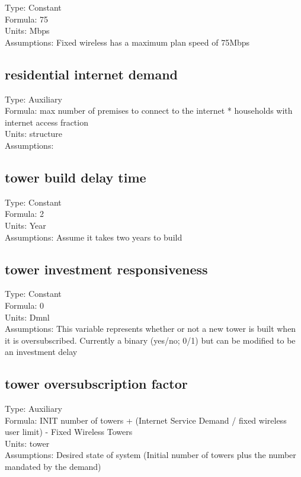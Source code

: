 \documentclass[
  11pt,
]{book}
\begin{document}
Type: Constant\\
Formula: 75\\
Units: Mbps\\
Assumptions: Fixed wireless has a maximum plan speed of 75Mbps

\hypertarget{residential-internet-demand}{%
\subsection{residential internet demand}\label{residential-internet-demand}}

Type: Auxiliary\\
Formula: max number of premises to connect to the internet * households with internet access fraction\\
Units: structure\\
Assumptions:

\hypertarget{tower-build-delay-time}{%
\subsection{tower build delay time}\label{tower-build-delay-time}}

Type: Constant\\
Formula: 2\\
Units: Year\\
Assumptions: Assume it takes two years to build

\hypertarget{tower-investment-responsiveness}{%
\subsection{tower investment responsiveness}\label{tower-investment-responsiveness}}

Type: Constant\\
Formula: 0\\
Units: Dmnl\\
Assumptions: This variable represents whether or not a new tower is built when it is oversubscribed. Currently a binary (yes/no; 0/1) but can be modified to be an investment delay

\hypertarget{tower-oversubscription-factor}{%
\subsection{tower oversubscription factor}\label{tower-oversubscription-factor}}

Type: Auxiliary\\
Formula: INIT number of towers + (Internet Service Demand / fixed wireless user limit) - Fixed Wireless Towers\\
Units: tower\\
Assumptions: Desired state of system (Initial number of towers plus the number mandated by the demand)
\end{document}
